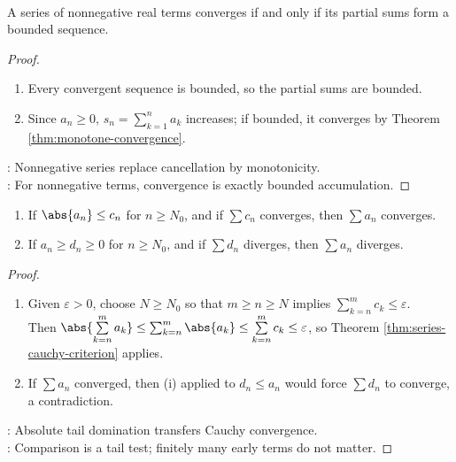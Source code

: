 \begin{theorem} \label{thm:nonnegative-series-bounded-partial-sums} \\
A series of nonnegative real terms converges if and only if its partial sums form a bounded sequence.
\begin{proof}
\begin{enumerate}[label=\roman*.]
\setlength{\itemsep}{0pt}
\item[$(\Rightarrow)$] Every convergent sequence is bounded, so the partial sums are bounded.
\item[$(\Leftarrow)$] Since $a_n\geq0$, $s_n=\sum\limits_{k=1}^{n}a_k$ increases; if bounded, it converges by Theorem \ref{thm:monotone-convergence}.
\end{enumerate}
: Nonnegative series replace cancellation by monotonicity.\\
: For nonnegative terms, convergence is exactly bounded accumulation.
\end{proof}
\end{theorem}

\begin{theorem} \label{thm:series-comparison-test} 
\begin{enumerate}[label=(\roman*)]
\setlength{\itemsep}{0pt}
\item If $\abs{a_n}\leq c_n$ for $n\geq N_0$, and if $\sum c_n$ converges, then $\sum a_n$ converges.
\item If $a_n\geq d_n\geq0$ for $n\geq N_0$, and if $\sum d_n$ diverges, then $\sum a_n$ diverges.
\end{enumerate}
\begin{proof}
\begin{enumerate}[label=(\roman*)]
\setlength{\itemsep}{0pt}
\item Given $\varepsilon>0$, choose $N\geq N_0$ so that $m\geq n\geq N$ implies $\sum_{k=n}^{m}c_k\leq\varepsilon$.\\
Then $\abs{\sum\limits_{k=n}^{m}a_k}\leq\sum_{k=n}^{m}\abs{a_k}\leq\sum\limits_{k=n}^{m}c_k\leq\varepsilon$, so Theorem \ref{thm:series-cauchy-criterion} applies.
\item If $\sum a_n$ converged, then (i) applied to $d_n\leq a_n$ would force $\sum d_n$ to converge, a contradiction.
\end{enumerate}
: Absolute tail domination transfers Cauchy convergence.\\
: Comparison is a tail test; finitely many early terms do not matter.
\end{proof}
\end{theorem}

